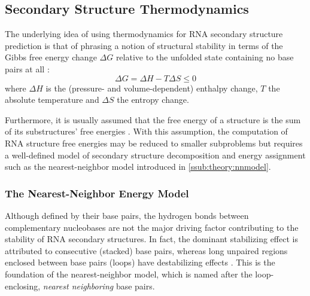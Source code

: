 \documentclass[../../master.tex]{subfiles}
\begin{document}
	
\subsection{Secondary Structure Thermodynamics}
\label{sub:theory:thermodynamics}

The underlying idea of using thermodynamics for RNA secondary structure prediction is that of phrasing a notion of structural stability in terms of the Gibbs free energy change $\Delta G$ relative to the unfolded state containing no base pairs at all \parencite{tinoco_estimation_1971}:
\begin{equation}\label{eq:gibbs}
	\Delta G = \Delta H - T \Delta S \leq 0
\end{equation}
where $\Delta H$ is the (pressure- and volume-dependent) enthalpy change, $T$ the absolute temperature and $\Delta S$ the entropy change.

Furthermore, it is usually assumed that the free energy of a structure is the sum of its substructures' free energies \parencite{dill_additivity_1997}.
With this assumption, the computation of RNA structure free energies may be reduced to smaller subproblems but requires a well-defined model of secondary structure decomposition and energy assignment such as the nearest-neighbor model introduced in \autoref{ssub:theory:nnmodel}.






\subsubsection{The Nearest-Neighbor Energy Model}
\label{ssub:theory:nnmodel}


Although defined by their base pairs, the hydrogen bonds between complementary nucleobases are not the major driving factor contributing to the stability of RNA secondary structures.
In fact, the dominant stabilizing effect is attributed to consecutive (stacked) base pairs, whereas long unpaired regions enclosed between base pairs (loops) have destabilizing effects \parencite{fresco_molecular_1960, hofacker_rna_2006}.
This is the foundation of the nearest-neighbor model, which is named after the loop-enclosing, \emph{nearest neighboring} base pairs.
\end{document}

